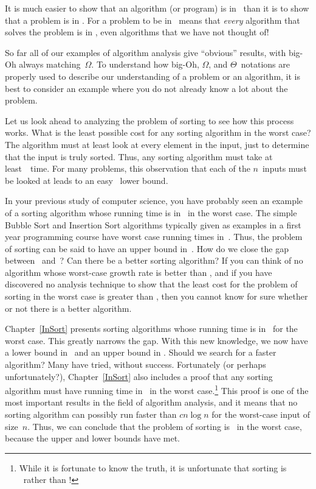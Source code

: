 It is much easier to show that an algorithm (or program) is in
\Omegafn\ than it is to show that a problem is in \Omegafn.
For a problem to be in \Omegafn\ means that \emph{every} algorithm
that solves the problem is in \Omegafn, even algorithms that we
have not thought of!

So far all of our examples of algorithm analysis
give ``obvious'' results, with big-Oh always matching~\(\Omega\).
To understand how big-Oh, \(\Omega\), and \(\Theta\)~notations
are properly used to describe our understanding of a problem or an
algorithm, it is best to consider an example where you do not already
know a lot about the problem.

Let us look ahead to analyzing the problem of sorting to see
how this process works.
What is the least possible cost for any sorting algorithm
in the worst case?
The algorithm must at least look at every element in the input, just
to determine that the input is truly sorted.
Thus, any sorting algorithm must take at least~\cn\ time.
For many problems, this observation that each of the \(n\)~inputs must
be looked at leads to an easy \Omegan\ lower bound.

In your previous study of computer science, you have probably
seen an example of a sorting algorithm whose running time is in
\Ontwo\ in the worst case.
The simple Bubble Sort and
Insertion Sort algorithms
typically given as examples in a first year programming course have
worst case running times in~\Ontwo.
Thus, the problem of sorting can be said to have an upper bound
in~\Ontwo.
How do we close the gap between \Omegan\ and~\Ontwo?
Can there be a better sorting algorithm?
If you can think of no algorithm whose worst-case growth rate is
better than \Ontwo, and if you have discovered no
analysis technique to show that the least cost for the problem of
sorting in the worst case is greater than \Omegan, then you cannot
know for sure whether or not there is a better algorithm.

Chapter~\ref{InSort} presents sorting algorithms whose
running time is in \Onlogn\ for the worst case.
This greatly narrows the gap.
With this new knowledge, we now have a lower bound in \Omegan\ and an
upper bound in \Onlogn.
Should we search for a faster algorithm?
Many have tried, without success.
Fortunately (or perhaps unfortunately?), Chapter~\ref{InSort} also
includes a proof that any sorting algorithm must have running time in
\Omeganlogn\ in the worst case.\footnote{While it is fortunate to know
the truth, it is unfortunate that sorting is \Thetanlogn\ rather than
\Thetan!}
This proof is one of the most important results in
the field of algorithm analysis, and it means that no sorting
algorithm can possibly run faster than \(c n \log n\) for the
worst-case input of size~\(n\).
Thus, we can conclude that the problem of sorting is
\Thetanlogn\ in the worst case, because the upper and lower bounds
have met.

